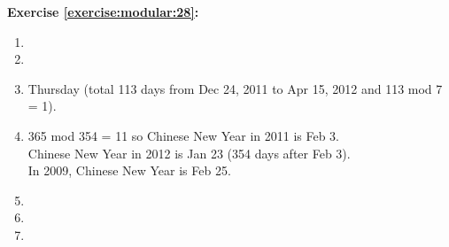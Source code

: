 \noindent\textbf{Exercise \ref{exercise:modular:28}:}
\begin{enumerate}
\item

\item

\item
Thursday (total 113 days from Dec 24, 2011 to Apr 15, 2012 and 113 mod 7 = 1).

\item
365 mod 354 = 11 so Chinese New Year in 2011 is Feb 3.\\
Chinese New Year in 2012 is Jan 23 (354 days after Feb 3).\\
In 2009, Chinese New Year is Feb 25.\\

\item

\item

\item
\end{enumerate}

